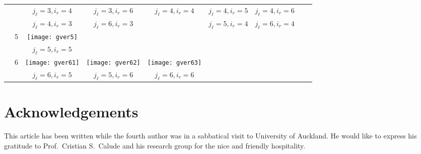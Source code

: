 \documentclass[12pt]{article}
\theoremstyle{definition}
\theoremstyle{remark}
\begin{document}
\begin{table}
{\begin{tabular}{ r|c|c|c|c|c|c|c|c| }
\cline{3-7}
&  & $j_{\ell}=3,i_r=4$ & $j_{\ell}=3,i_r=6$ & $j_{\ell}=4,i_r=4$ & $j_{\ell}=4,i_r=5$ & $j_{\ell}=4,i_r=6$   \\
\cline{3-7}
&  & $j_{\ell}=4,i_r=3$ & $j_{\ell}=6,i_r=3$ &  & $j_{\ell}=5,i_r=4$ & $j_{\ell}=6,i_r=4$   \\
\cline{2-7}
& 5 & \begin{minipage}{.20\textwidth}\vspace{2mm}
	\texttt{[image: gver5]}\vspace{2mm}
\end{minipage} &  &  &  &  \\
\cline{3-7}
&  & $j_{\ell}=5,i_r=5$  &  &  &  &  \\

\cline{2-7}
& 6 & \begin{minipage}{.20\textwidth}\vspace{2mm}
	\texttt{[image: gver61]}\vspace{2mm}
\end{minipage} & \begin{minipage}{.20\textwidth}
\texttt{[image: gver62]}
\end{minipage} & \begin{minipage}{.20\textwidth}
\texttt{[image: gver63]}
\end{minipage} &  &    \\
\cline{3-7}
&  & $j_{\ell}=6,i_r=5$ & $j_{\ell}=5,i_r=6$ & $j_{\ell}=6,i_r=6$ &  &    \\
\cline{2-7}
\end{tabular}
}
\end{table}

\section*{Acknowledgements}

This article has been written while the fourth author was in a sabbatical visit to University of Auckland. He would like to express his gratitude to Prof.~Cristian S.~Calude and his research group for the nice and friendly hospitality. 
\end{document}
